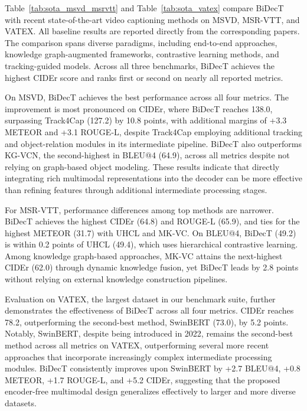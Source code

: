 Table~\ref{tab:sota_msvd_msrvtt} and Table~\ref{tab:sota_vatex} compare BiDecT with recent state-of-the-art video captioning methods on MSVD, MSR-VTT, and VATEX. All baseline results are reported directly from the corresponding papers. The comparison spans diverse paradigms, including end-to-end approaches, knowledge graph-augmented frameworks, contrastive learning methods, and tracking-guided models. Across all three benchmarks, BiDecT achieves the highest CIDEr score and ranks first or second on nearly all reported metrics.

On MSVD, BiDecT achieves the best performance across all four metrics. The improvement is most pronounced on CIDEr, where BiDecT reaches 138.0, surpassing Track4Cap (127.2) by 10.8 points, with additional margins of +3.3 METEOR and +3.1 ROUGE-L, despite Track4Cap employing additional tracking and object-relation modules in its intermediate pipeline. BiDecT also outperforms KG-VCN, the second-highest in BLEU@4 (64.9), across all metrics despite not relying on graph-based object modeling. These results indicate that directly integrating rich multimodal representations into the decoder can be more effective than refining features through additional intermediate processing stages.

For MSR-VTT, performance differences among top methods are narrower. BiDecT achieves the highest CIDEr (64.8) and ROUGE-L (65.9), and ties for the highest METEOR (31.7) with UHCL and MK-VC. On BLEU@4, BiDecT (49.2) is within 0.2 points of UHCL (49.4), which uses hierarchical contrastive learning. Among knowledge graph-based approaches, MK-VC attains the next-highest CIDEr (62.0) through dynamic knowledge fusion, yet BiDecT leads by 2.8 points without relying on external knowledge construction pipelines.

Evaluation on VATEX, the largest dataset in our benchmark suite, further demonstrates the effectiveness of BiDecT across all four metrics. CIDEr reaches 78.2, outperforming the second-best method, SwinBERT (73.0), by 5.2 points. Notably, SwinBERT, despite being introduced in 2022, remains the second-best method across all metrics on VATEX, outperforming several more recent approaches that incorporate increasingly complex intermediate processing modules. BiDecT consistently improves upon SwinBERT by +2.7 BLEU@4, +0.8 METEOR, +1.7 ROUGE-L, and +5.2 CIDEr, suggesting that the proposed encoder-free multimodal design generalizes effectively to larger and more diverse datasets.

